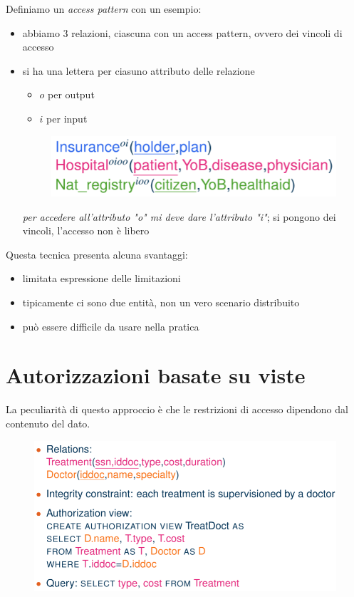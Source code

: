\documentclass{report}
\begin{document}
\noindent Definiamo un \textit{access pattern} con un esempio:
\begin{itemize}
    \item abbiamo 3 relazioni, ciascuna con un access pattern, ovvero dei vincoli di accesso
    \item si ha una lettera per ciasuno attributo delle relazione
    \begin{itemize}
        \item $o$ per output 
        \item $i$ per input 
    \end{itemize}

    \begin{figure}[H]
        \centering
        \includegraphics[width=0.6\linewidth]{images/access-pattern.png}
    \end{figure}

    \noindent \textit{per accedere all'attributo "o" mi deve dare l'attributo "i"}; si pongono dei vincoli, 
    l'accesso non è libero
\end{itemize}

\noindent Questa tecnica presenta alcuna svantaggi:
\begin{itemize}
    \item limitata espressione delle limitazioni 
    \item tipicamente ci sono due entità, non un vero scenario distribuito 
    \item può essere difficile da usare nella pratica 
\end{itemize}

\section{Autorizzazioni basate su viste}
La peculiarità di questo approccio è che le restrizioni di accesso dipendono dal contenuto del dato.

\begin{figure}[H]
    \centering
    \includegraphics[width=0.8\linewidth]{images/view-auth.png}
\end{figure}
\end{document}
